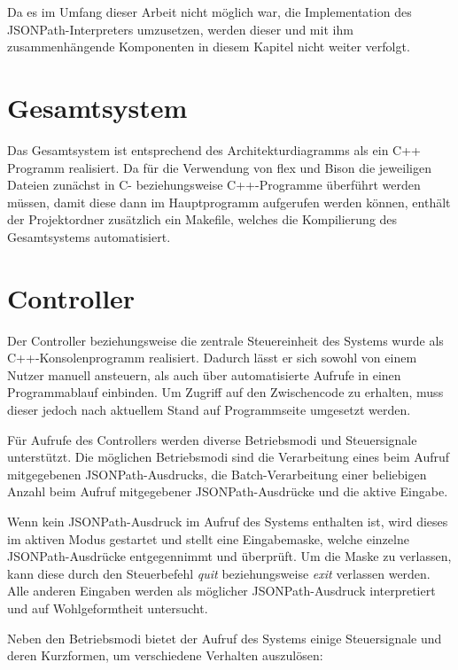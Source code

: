\documentclass[oneside]{ausarbeitung}
\begin{document}
Da es im Umfang dieser Arbeit nicht möglich war, die Implementation des JSONPath-Interpreters umzusetzen, werden dieser und mit ihm zusammenhängende Komponenten in diesem Kapitel nicht weiter verfolgt.



\section{Gesamtsystem}
	
Das Gesamtsystem ist entsprechend des Architekturdiagramms als ein C++ Programm realisiert. Da für die Verwendung von flex und Bison die jeweiligen Dateien zunächst in C- beziehungsweise C++-Programme überführt werden müssen, damit diese dann im Hauptprogramm aufgerufen werden können, enthält der Projektordner zusätzlich ein Makefile, welches die Kompilierung des Gesamtsystems automatisiert.
	
\section{Controller}
	
Der Controller beziehungsweise die zentrale Steuereinheit des Systems wurde als C++-Konsolenprogramm realisiert. Dadurch lässt er sich sowohl von einem Nutzer manuell ansteuern, als auch über automatisierte Aufrufe in einen Programmablauf einbinden. Um Zugriff auf den Zwischencode zu erhalten, muss dieser jedoch nach aktuellem Stand auf Programmseite umgesetzt werden.
	
Für Aufrufe des Controllers werden diverse Betriebsmodi und Steuersignale unterstützt. Die möglichen Betriebsmodi sind die Verarbeitung eines beim Aufruf mitgegebenen JSONPath-Ausdrucks, die Batch-Verarbeitung einer beliebigen Anzahl beim Aufruf mitgegebener JSONPath-Ausdrücke und die aktive Eingabe.
	
\pagebreak

Wenn kein JSONPath-Ausdruck im Aufruf des Systems enthalten ist, wird dieses im aktiven Modus gestartet und stellt eine Eingabemaske, welche einzelne JSONPath-Ausdrücke entgegennimmt und überprüft. Um die Maske zu verlassen, kann diese durch den Steuerbefehl \textit{quit} beziehungsweise \textit{exit} verlassen werden. Alle anderen Eingaben werden als möglicher JSONPath-Ausdruck interpretiert und auf Wohlgeformtheit untersucht.
	
Neben den Betriebsmodi bietet der Aufruf des Systems einige Steuersignale und deren Kurzformen, um verschiedene Verhalten auszulösen:
\end{document}
